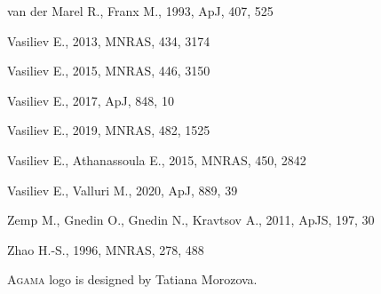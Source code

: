 \documentclass[12pt]{article}
\newcommand{\Agama}{\textsc{Agama}\xspace}
\begin{document}
\begin{thebibliography}{99}
van der Marel R., Franx M., 1993, ApJ, 407, 525

Vasiliev E., 2013, MNRAS, 434, 3174

Vasiliev E., 2015, MNRAS, 446, 3150

Vasiliev E., 2017, ApJ, 848, 10

Vasiliev E., 2019, MNRAS, 482, 1525

Vasiliev E., Athanassoula E., 2015, MNRAS, 450, 2842

Vasiliev E., Valluri M., 2020, ApJ, 889, 39

Zemp M., Gnedin O., Gnedin N., Kravtsov A., 2011, ApJS, 197, 30

Zhao H.-S., 1996, MNRAS, 278, 488

\end{thebibliography}

\vspace{-3mm}\noindent \Agama logo is designed by Tatiana Morozova.
\end{document}
